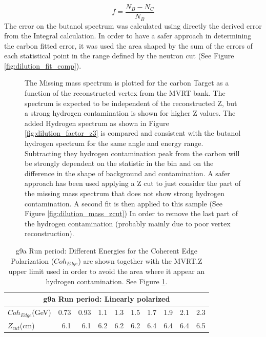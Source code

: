 $$
f = \frac{N_B - N_C}{N_B}
$$
The error on the butanol spectrum was calculated using directly the derived error from the Integral calculation. In order to have a safer approach in determining the carbon fitted error, it was used the area shaped by the sum of the errors of each statistical point in the range defined by the neutron cut (See Figure \ref{fig:dilution_fit_comp}). 
\begin{figure}[htb]
  \begin{center}
    \qquad
    \qquad

    \caption{The Missing mass spectrum is plotted for the carbon Target as a function of the reconstructed vertex from the MVRT bank. The spectrum is expected to be independent of the reconstructed Z, but a strong hydrogen contamination is shown for higher Z values. The added Hydrogen spectrum as shown in Figure \ref{fig:dilution_factor_z3} is compared and consistent with the butanol hydrogen spectrum for the same angle and energy range. Subtracting they hydrogen contamination peak from the carbon will be strongly dependent on the statistic in the bin and on the difference in the shape of background and contamination. A safer approach has been used applying a Z cut to just consider the part of the missing mass spectrum that does not show strong hydrogen contamination. A second fit is then applied to this sample (See Figure \ref{fig:dilution_mass_zcut}) In order to remove the last part of the hydrogen contamination (probably mainly due to poor vertex reconstruction).}
    \label{fig:dilution_factor_z0}
  \end{center}
\end{figure}

\begin{table}
  \begin{center}
    \begin{tabular}{ ||l|r|r|r|r|r|r|r|r|r||}
      \hline
      \multicolumn{10}{|c|}{g9a Run period: Linearly polarized } \\
      \hline
      $Coh_{Edge}$(GeV)&0.73&0.93&1.1&1.3&1.5&1.7&1.9&2.1&2.3 \\
      \hline
      $Z_{cut}$(cm)&6.1&6.1&6.2&6.2&6.2&6.4&6.4&6.4&6.5 \\
      \hline
    \end{tabular}
  \end{center}
  \caption{g9a Run period: Different Energies for the Coherent Edge Polarization ($Coh_{Edge}$) are shown together with the MVRT.Z upper limit used in order to avoid the area where it appear an hydrogen contamination. See Figure \ref{fig:dilution_factor_z0}.}
  \label{table:dil_factor_zcut}
\end{table}

